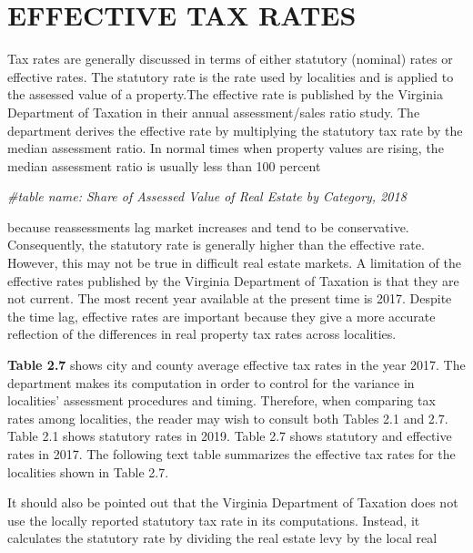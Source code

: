 \documentclass[
]{book}
\newenvironment{Shaded}{\begin{snugshade}}{\end{snugshade}}
\newcommand{\CommentTok}[1]{\textcolor[rgb]{0.56,0.35,0.01}{\textit{#1}}}
\begin{document}
\hypertarget{effective-tax-rates}{%
\section{EFFECTIVE TAX RATES}\label{effective-tax-rates}}

Tax rates are generally discussed in terms of either statutory (nominal) rates or effective rates. The statutory rate is the rate used by localities and is applied to the assessed value of a property.The effective rate is published by the Virginia Department of Taxation in their annual assessment/sales ratio study. The department derives the effective rate by multiplying the statutory tax rate by the median assessment ratio. In normal times when property values are rising, the median assessment ratio is usually less than 100 percent

\begin{Shaded}
\begin{Highlighting}[]
\CommentTok{\#table name: Share of Assessed Value of Real Estate by Category, 2018}
\end{Highlighting}
\end{Shaded}

because reassessments lag market increases and tend to be conservative. Consequently, the statutory rate is generally higher than the effective rate. However, this may not be true in difficult real estate markets. A limitation of the effective rates published by the Virginia Department of Taxation is that they are not current. The most recent year available at the present time is 2017. Despite the time lag, effective rates are important because they give a more accurate reflection of the differences in real property tax rates across localities.

\textbf{Table 2.7} shows city and county average effective tax rates in the year 2017. The department makes its computation in order to control for the variance in localities' assessment procedures and timing. Therefore, when comparing tax rates among localities, the reader may wish to consult both Tables 2.1 and 2.7. Table 2.1 shows statutory rates in 2019. Table 2.7 shows statutory and effective rates in 2017. The following text table summarizes the effective tax rates for the localities shown in Table 2.7.

It should also be pointed out that the Virginia Department of Taxation does not use the locally reported statutory tax rate in its computations. Instead, it calculates the statutory rate by dividing the real estate levy by the local real
\end{document}

